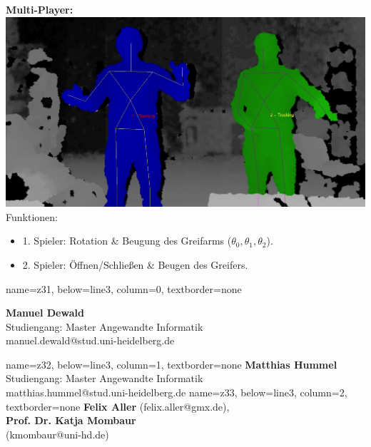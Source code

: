\documentclass[portrait,a0paper]{baposter}
\begin{document}
\begin{poster}
{ \textbf{Multi-Player:} \vspace*{0.2cm}\\
\includegraphics[width=\textwidth]{imgs/multiplayer_crop.png}\vspace*{0.05cm} \\
Funktionen: 
\begin{itemize}
\item 1. Spieler: Rotation \& Beugung des Greifarms ($\theta_0, \theta_1, \theta_2$).
\item 2. Spieler: Öffnen/Schließen \& Beugen des Greifers.
\end{itemize}
 }



 {}

    {
    name=z31,
    below=line3,
    column=0,
    textborder=none
    }
    {
    \textsf{\textbf{Manuel Dewald}\\
    Studiengang: Master Angewandte Informatik\\
	manuel.dewald@stud.uni-heidelberg.de
	}

 }
  \headerbox{}
    {
    name=z32,
    below=line3,
    column=1,
    textborder=none
    }
    {
    \textsf{\textbf{Matthias Hummel}\\
    	Studiengang: Master Angewandte Informatik\\
	matthias.hummel@stud.uni-heidelberg.de 
	}
 }
    {
    name=z33,
    below=line3,
    column=2,
    textborder=none
    }
    {
    \textsf{\textbf{Felix Aller} (felix.aller@gmx.de),\\
    \textbf{Prof. Dr. Katja Mombaur}\\(kmombaur@uni-hd.de)}
  }


\end{poster}
\end{document}
